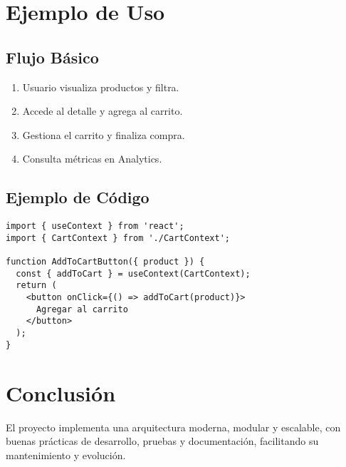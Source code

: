 \documentclass[12pt]{article}
\begin{document}
\section{Ejemplo de Uso}
\subsection*{Flujo Básico}
\begin{enumerate}
  \item Usuario visualiza productos y filtra.
  \item Accede al detalle y agrega al carrito.
  \item Gestiona el carrito y finaliza compra.
  \item Consulta métricas en Analytics.
\end{enumerate}

\subsection*{Ejemplo de Código}
\begin{verbatim}
import { useContext } from 'react';
import { CartContext } from './CartContext';

function AddToCartButton({ product }) {
  const { addToCart } = useContext(CartContext);
  return (
    <button onClick={() => addToCart(product)}>
      Agregar al carrito
    </button>
  );
}
\end{verbatim}

\section{Conclusión}
El proyecto implementa una arquitectura moderna, modular y escalable, con buenas prácticas de desarrollo, pruebas y documentación, facilitando su mantenimiento y evolución.
\end{document}
